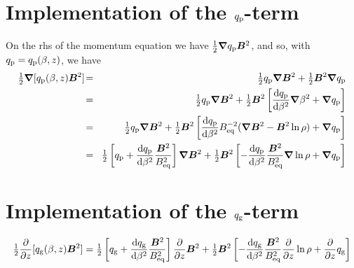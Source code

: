 \documentclass{article}
\title{}
\author{}
\date{\today,~ $ $Revision: 1.57 $ $}
\begin{document}
\maketitle

\section{Implementation of the $q_{\rm p}$-term}

On the rhs of the momentum equation we have ${\textstyle{1\over2}}{\bm{\nabla}}q_{\rm p}\bm{B}^2$, and so,
with $q_{\rm p}=q_{\rm p}(\beta,z)$, we have
\begin{eqnarray}
\half\nab[\qp(\beta,z)\BB^2]
\!&=&\!\half\qp\nab\BB^2+\half\BB^2\nab\qp\\
\!&=&\!\half\qp\nab\BB^2+\half\BB^2\left[{\dd\qp\over\dd\beta^2}\nab\beta^2+\nab\qp\right]
\\
\!&=&\!\half\qp\nab\BB^2+\half\BB^2\left[{\dd\qp\over\dd\beta^2}\Beq^{-2}(
\nab\BB^2-\BB^2\ln\rho)+\nab\qp\right]
\\
\!&=&\!\half\left[\qp+{\dd\qp\over\dd\beta^2}{\BB^2\over\Beq^2}\right]\nab\BB^2
+\half\BB^2\left[-{\dd\qp\over\dd\beta^2}{\BB^2\over\Beq^2}\nab\ln\rho+\nab\qp\right]
\end{eqnarray}

\section{Implementation of the $q_{\rm g}$-term}

\begin{eqnarray}
{\textstyle{1\over2}}{\partial\over\partial z}[q_{\rm g}(\beta,z)\bm{B}^2]
={\textstyle{1\over2}}\left[q_{\rm g}+{{\rm d} {}q_{\rm g}\over{\rm d} {}\beta^2}{\bm{B}^2\over B_{\rm eq}^2}\right]{\partial\over\partial z}\bm{B}^2
+{\textstyle{1\over2}}\bm{B}^2\left[-{{\rm d} {}q_{\rm g}\over{\rm d} {}\beta^2}{\bm{B}^2\over B_{\rm eq}^2}{\partial\over\partial z}\ln\rho+{\partial\over\partial z}q_{\rm g}\right]
\end{eqnarray}



\end{document}
